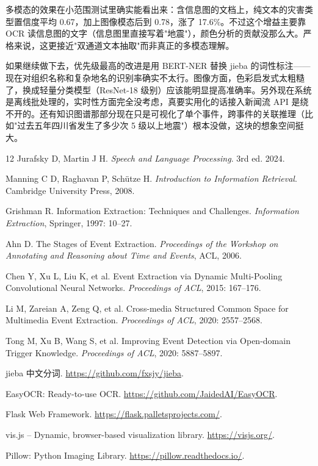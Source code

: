 \documentclass[12pt, a4paper]{ctexart}
\begin{document}
多模态的效果在小范围测试里确实能看出来：含信息图的文档上，纯文本的灾害类型置信度平均 0.67，加上图像模态后到 0.78，涨了 17.6\%。不过这个增益主要靠 OCR 读信息图的文字（信息图里直接写着"地震"），颜色分析的贡献没那么大。严格来说，这更接近"双通道文本抽取"而非真正的多模态理解。

如果继续做下去，优先级最高的改进是用 BERT-NER 替换 jieba 的词性标注——现在对组织名称和复杂地名的识别率确实不太行。图像方面，色彩启发式太粗糙了，换成轻量分类模型（ResNet-18 级别）应该能明显提高准确率。另外现在系统是离线批处理的，实时性方面完全没考虑，真要实用化的话接入新闻流 API 是绕不开的。还有知识图谱那部分现在只是可视化了单个事件，跨事件的关联推理（比如"过去五年四川省发生了多少次 5 级以上地震"）根本没做，这块的想象空间挺大。


\begin{thebibliography}{12}
    Jurafsky D, Martin J H.
    \textit{Speech and Language Processing}. 3rd ed. 2024.

    Manning C D, Raghavan P, Schütze H.
    \textit{Introduction to Information Retrieval}.
    Cambridge University Press, 2008.

    Grishman R.
    Information Extraction: Techniques and Challenges.
    \textit{Information Extraction}, Springer, 1997: 10--27.

    Ahn D.
    The Stages of Event Extraction.
    \textit{Proceedings of the Workshop on Annotating and Reasoning about Time and Events}, ACL, 2006.

    Chen Y, Xu L, Liu K, et al.
    Event Extraction via Dynamic Multi-Pooling Convolutional Neural Networks.
    \textit{Proceedings of ACL}, 2015: 167--176.

    Li M, Zareian A, Zeng Q, et al.
    Cross-media Structured Common Space for Multimedia Event Extraction.
    \textit{Proceedings of ACL}, 2020: 2557--2568.

    Tong M, Xu B, Wang S, et al.
    Improving Event Detection via Open-domain Trigger Knowledge.
    \textit{Proceedings of ACL}, 2020: 5887--5897.

    jieba 中文分词.
    \url{https://github.com/fxsjy/jieba}.

    EasyOCR: Ready-to-use OCR.
    \url{https://github.com/JaidedAI/EasyOCR}.

    Flask Web Framework.
    \url{https://flask.palletsprojects.com/}.

    vis.js -- Dynamic, browser-based visualization library.
    \url{https://visjs.org/}.

    Pillow: Python Imaging Library.
    \url{https://pillow.readthedocs.io/}.
\end{thebibliography}
\end{document}

